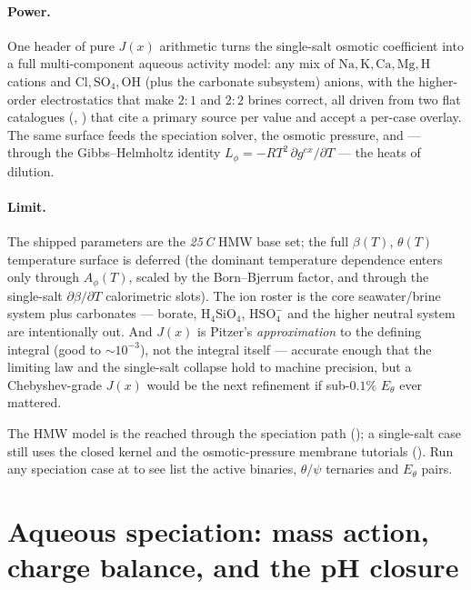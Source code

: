\documentclass[11pt,a4paper]{article}
\begin{document}
\paragraph{Power.}  One header of pure $J(x)$ arithmetic turns the
single-salt osmotic coefficient into a full multi-component aqueous
activity model: any mix of $\text{Na},\text{K},\text{Ca},\text{Mg},
\text{H}$ cations and $\text{Cl},\text{SO}_4,\text{OH}$ (plus the
carbonate subsystem) anions, with the higher-order electrostatics that
make $2{:}1$ and $2{:}2$ brines correct, all driven from two flat
catalogues (, ) that cite a primary
source per value and accept a per-case overlay.  The same surface feeds
the speciation solver, the osmotic pressure, and --- through the
Gibbs--Helmholtz identity $L_\phi=-RT^2\,\partial g^{ex}/\partial T$ ---
the heats of dilution.

\paragraph{Limit.}  The shipped parameters are the \emph{25\,\textdegree C}
HMW base set; the full $\beta(T)$, $\theta(T)$ temperature surface is
deferred (the dominant temperature dependence enters only through
$A_\phi(T)$, scaled by the Born--Bjerrum factor, and through the
single-salt $\partial\beta/\partial T$ calorimetric slots).  The ion
roster is the core seawater/brine system plus carbonates --- borate,
$\text{H}_4\text{SiO}_4$, $\text{HSO}_4^-$ and the higher neutral system
are intentionally out.  And $J(x)$ is Pitzer's \emph{approximation} to
the defining integral (good to $\sim10^{-3}$), not the integral itself
--- accurate enough that the limiting law and the single-salt collapse
hold to machine precision, but a Chebyshev-grade $J(x)$ would be the next
refinement if sub-$0.1\%$ $E_\theta$ ever mattered.

\begin{tutoriallink}
The HMW model is the   reached through
the speciation path (); a single-salt case still
uses the closed  kernel and the osmotic-pressure
membrane tutorials ().  Run any speciation case
at  to see  list the active
binaries, $\theta/\psi$ ternaries and $E_\theta$ pairs.
\end{tutoriallink}

\section{Aqueous speciation: mass action, charge balance, and the
pH closure}\label{ch:speciation}
\end{document}
